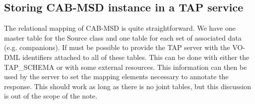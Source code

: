 \documentclass[11pt,a4paper]{ivoa}
\begin{document}
\subsection{Storing CAB-MSD instance in a TAP service}
The relational mapping of CAB-MSD is quite straightforward. We have one master table for the Source class and one table for each set of associated data (e.g. companions).
If must be possible to provide the TAP server with the VO-DML identifiers attached to all of these tables. This can be done with either the TAP\_SCHEMA or with some external resources.
This information can then be used by the server to set the mapping elements necessary to annotate the response. This should work as long as there is no joint tables, but this discussion is out of the scope of the note.



\end{document}

